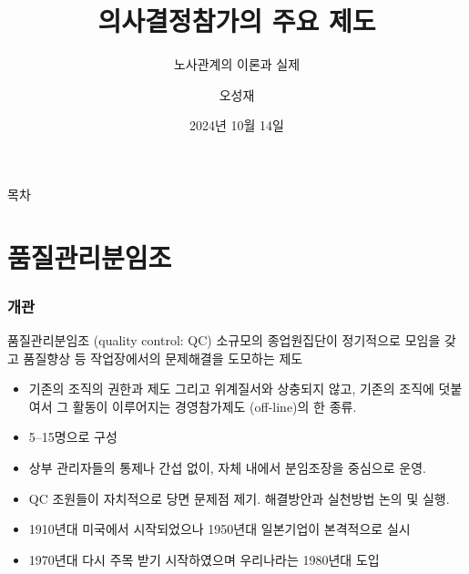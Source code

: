 \documentclass[aspectratio=169,xcolor=dvipsnames,handout]{beamer}
\title{의사결정참가의 주요 제도}
\subtitle{노사관계의 이론과 실제}
\author{오성재}
\institute[CNU]
{\relax
    충남대학교 경제학과
    }
\date{2024년 10월 14일}
\begin{document}

\frame{\titlepage}

\begin{frame}{목차}
    \small
    \tableofcontents[hideallsubsections]
\end{frame}

\section{품질관리분임조}

\begin{frame}
    \frametitle{개관}
    \begin{block}{품질관리분임조 (quality control: QC)}
        소규모의 종업원집단이 정기적으로 모임을 갖고 품질향상 등 작업장에서의 문제해결을 도모하는 제도
    \end{block}
    \begin{itemize}[<+->]
        \item 기존의 조직의 권한과 제도 그리고 위계질서와 상충되지 않고, 기존의 조직에 덧붙여서 그 활동이 이루어지는 경영참가제도 (off-line)의 한 종류.
        \item 5--15명으로 구성
        \item 상부 관리자들의 통제나 간섭 없이, 자체 내에서 분임조장을 중심으로 운영.
        \item QC 조원들이 자치적으로 당면 문제점 제기. 해결방안과 실천방법 논의 및 실행.
        \item 1910년대 미국에서 시작되었으나 1950년대 일본기업이 본격적으로 실시
        \item 1970년대 다시 주목 받기 시작하였으며 우리나라는 1980년대 도입
    \end{itemize}
\end{frame}
\end{document}
